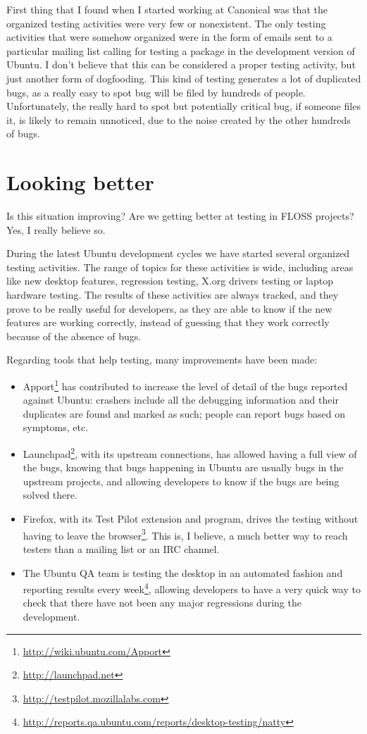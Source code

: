 First thing that I found when I started working at Canonical was that the organized testing activities were very few or nonexistent. The only testing activities that were somehow organized were in the form of emails sent to a particular mailing list calling for testing a package in the development version of Ubuntu. I don't believe that this can be considered a proper testing activity, but just another form of dogfooding. This kind of testing generates a lot of duplicated bugs, as a really easy to spot bug will be filed by hundreds of people. Unfortunately, the really hard to spot but potentially critical bug, if someone files it, is likely to remain unnoticed, due to the noise created by the other hundreds of bugs.

\section*{Looking better}

Is this situation improving? Are we getting better at testing in FLOSS projects? Yes, I really believe so.

During the latest Ubuntu development cycles we have started several organized testing activities. The range of topics for these activities is wide, including areas like new desktop features, regression testing, X.org drivers testing or laptop hardware testing. The results of these activities are always tracked, and they prove to be really useful for developers, as they are able to know if the new features are working correctly, instead of guessing that they work correctly because of the absence of bugs.

Regarding tools that help testing, many improvements have been made:
\begin{itemize}
 \item Apport\footnote{\url{http://wiki.ubuntu.com/Apport}} has contributed to increase the level of detail of the bugs reported against Ubuntu: crashers include all the debugging information and their duplicates are found and marked as such; people can report bugs based on symptoms, etc.
 \item Launchpad\footnote{\url{http://launchpad.net}}, with its upstream connections, has allowed having a full view of the bugs, knowing that bugs happening in Ubuntu are usually bugs in the upstream projects, and allowing developers to know if the bugs are being solved there. 
 \item Firefox, with its Test Pilot extension and program, drives the testing without having to leave the browser\footnote{\url{http://testpilot.mozillalabs.com}}. This is, I believe, a much better way to reach testers than a mailing list or an IRC channel.
 \item The Ubuntu QA team is testing the desktop in an automated fashion and reporting results every week\footnote{\url{http://reports.qa.ubuntu.com/reports/desktop-testing/natty}}, allowing developers to have a very quick way to check that there have not been any major regressions during the development.
\end{itemize}

